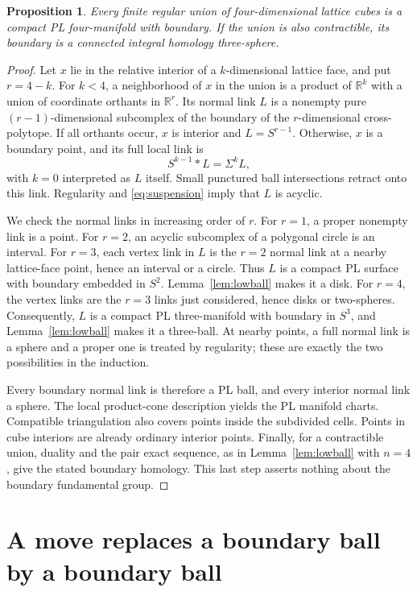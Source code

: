 \documentclass[11pt]{article}
\newtheorem{proposition}[theorem]{Proposition}
\theoremstyle{remark}
\newcommand{\R}{\mathbb R}
\begin{document}
\begin{proposition}\label{prop:manifold}
Every finite regular union of four-dimensional lattice cubes is a compact
PL four-manifold with boundary. If the union is also contractible, its
boundary is a connected integral homology three-sphere.
\end{proposition}

\begin{proof}
Let $x$ lie in the relative interior of a $k$-dimensional lattice face,
and put $r=4-k$. For $k<4$, a neighborhood of $x$ in the union is a product
of $\R^k$ with a union of coordinate orthants in $\R^r$. Its normal
link $L$ is a nonempty pure $(r-1)$-dimensional subcomplex of the boundary
of the $r$-dimensional cross-polytope. If all orthants occur, $x$ is
interior and $L=S^{r-1}$. Otherwise, $x$ is a boundary point, and its
full local link is
\[
 S^{k-1}*L=\Sigma^kL,
\]
with $k=0$ interpreted as $L$ itself. Small punctured ball intersections
retract onto this link. Regularity and \eqref{eq:suspension} imply that
$L$ is acyclic.

We check the normal links in increasing order of $r$. For $r=1$, a proper
nonempty link is a point. For $r=2$, an acyclic subcomplex of a polygonal
circle is an interval. For $r=3$, each vertex link in $L$ is the $r=2$
normal link at a nearby lattice-face point, hence an interval or a circle.
Thus $L$ is a compact PL surface with boundary embedded in $S^2$.
Lemma~\ref{lem:lowball} makes it a disk. For $r=4$, the vertex links are
the $r=3$ links just considered, hence disks or two-spheres. Consequently,
$L$ is a compact PL three-manifold with boundary in $S^3$, and
Lemma~\ref{lem:lowball} makes it a three-ball. At nearby points, a full
normal link is a sphere and a proper one is treated by regularity; these
are exactly the two possibilities in the induction.

Every boundary normal link is therefore a PL ball, and every interior
normal link a sphere. The local product-cone description yields the PL
manifold charts. Compatible triangulation also covers points inside the
subdivided cells. Points in cube interiors are already ordinary interior
points. Finally, for a contractible union, duality and the pair exact
sequence, as in Lemma~\ref{lem:lowball} with $n=4$, give the stated
boundary homology. This last step asserts nothing about the boundary
fundamental group.
\end{proof}

\section{A move replaces a boundary ball by a boundary ball}
\end{document}
